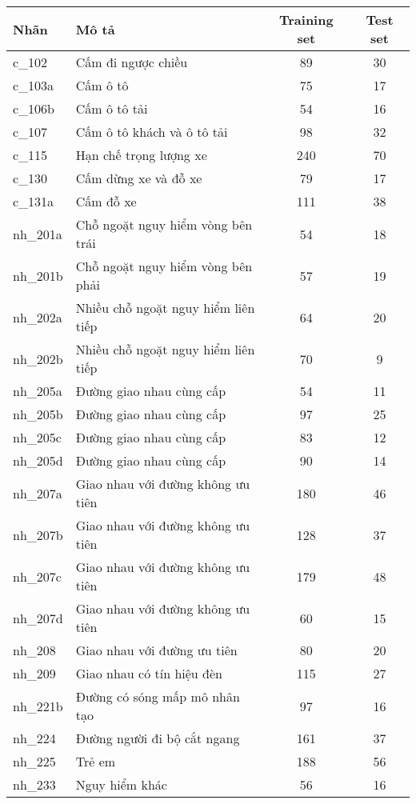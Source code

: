 \documentclass[../thesis.tex]{subfiles}
\begin{document}
\begin{table}[!htb]
\begin{longtable}{| l | l | c | c |}
	\hline
	Nhãn & Mô tả & Training set & Test set\\
	\hline
	c\_102 & Cấm đi ngược chiều & 89 & 30\\
	\hline
	c\_103a & Cấm ô tô & 75 & 17\\
	\hline
	c\_106b & Cấm ô tô tải & 54 & 16\\
	\hline
	c\_107 & Cấm ô tô  khách và ô tô  tải & 98 & 32\\
	\hline
	c\_115 & Hạn chế trọng lượng xe & 240 & 70\\
	\hline
	c\_130 & Cấm dừng xe và đỗ xe & 79 & 17\\
	\hline
	c\_131a & Cấm đỗ xe & 111 & 38\\
	\hline
	nh\_201a & Chỗ ngoặt nguy hiểm vòng bên trái & 54 & 18\\
	\hline
	nh\_201b & Chỗ ngoặt nguy hiểm vòng bên phải & 57 & 19\\
	\hline
	nh\_202a & Nhiều chỗ ngoặt nguy hiểm liên tiếp & 64 & 20\\
	\hline
	nh\_202b & Nhiều chỗ ngoặt nguy hiểm liên tiếp & 70 & 9\\
	\hline
	nh\_205a & Đường giao nhau cùng cấp & 54 & 11\\
	\hline
	nh\_205b & Đường giao nhau cùng cấp & 97 & 25\\
	\hline
	nh\_205c & Đường giao nhau cùng cấp & 83 & 12\\
	\hline
	nh\_205d & Đường giao nhau cùng cấp & 90 & 14\\
	\hline
	nh\_207a & Giao nhau với đường không ưu tiên & 180 & 46\\
	\hline
	nh\_207b & Giao nhau với đường không ưu tiên & 128 & 37\\
	\hline
	nh\_207c & Giao nhau với đường không ưu tiên & 179 & 48\\
	\hline
	nh\_207d & Giao nhau với đường không ưu tiên & 60 & 15\\
	\hline
	nh\_208 & Giao nhau với đường ưu tiên & 80 & 20\\
	\hline
	nh\_209 & Giao nhau có tín hiệu đèn & 115 & 27\\
	\hline
	nh\_221b & Đường có sóng mấp mô nhân tạo & 97 & 16\\
	\hline
	nh\_224 & Đường người đi bộ cắt ngang & 161 & 37\\
	\hline
	nh\_225 & Trẻ em & 188 & 56\\
	\hline
	nh\_233 & Nguy hiểm khác & 56 & 16\\

\end{longtable}
\end{table}
\end{document}
